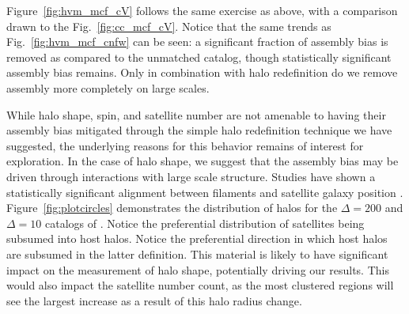 \documentclass[usenatbib,usegraphicx,letterpaper]{mn2e}
\begin{document}
Figure~\ref{fig:hvm_mcf_cV} follows the same exercise as above, with a comparison drawn to the Fig.~\ref{fig:cc_mcf_cV}. Notice that the same trends as Fig.~\ref{fig:hvm_mcf_cnfw} can be seen: a significant fraction of assembly bias is removed as compared to the unmatched catalog, though statistically significant assembly bias remains. Only in combination with halo redefinition do we remove assembly more completely on large scales.




While halo shape, spin, and satellite number are not amenable to having their assembly bias mitigated through the
simple halo redefinition technique we have suggested, the underlying reasons for this behavior remains of
interest for exploration. In the case of halo shape, we suggest that the assembly bias may be driven through
interactions with large scale structure. Studies have shown a statistically significant alignment between
filaments and satellite galaxy position \citep{tempel15, velliscig15}. Figure~\ref{fig:plotcircles} demonstrates the distribution of halos for the $\Delta=200$
and $\Delta=10$ catalogs of \simB. 
Notice the preferential distribution of satellites being subsumed into host halos.  Notice the preferential
direction in which host halos are subsumed in the latter definition. This material is likely to have significant
impact on the measurement of halo shape, potentially driving our results. This would also impact the satellite
number count, as the most clustered regions will see the largest increase as a result of this halo radius change.
\end{document}
